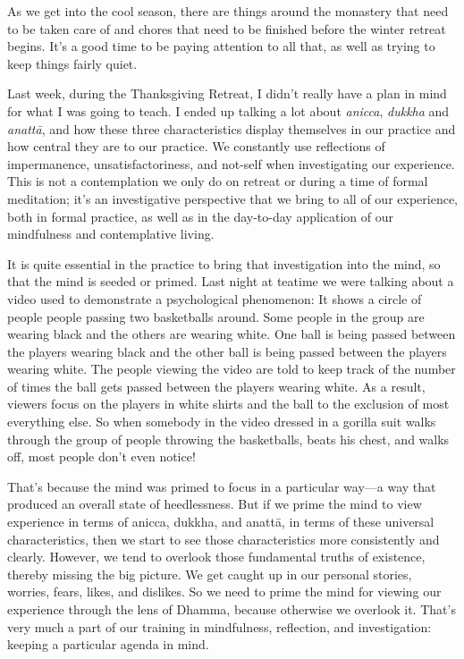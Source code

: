 
As we get into the cool season, there are things around the monastery 
that need to be taken care of and chores that need to be finished 
before the winter retreat begins. It's a good time to be paying 
attention to all that, as well as trying to keep things fairly quiet.

Last week, during the Thanksgiving Retreat, I didn't really have a plan 
in mind for what I was going to teach. I ended up talking a lot about 
\emph{anicca}, \emph{dukkha} and \emph{anattā}, and how these three 
characteristics display themselves in our practice and how central they 
are to our practice. We constantly use reflections of impermanence, 
unsatisfactoriness, and not-self when investigating our experience. 
This is not a contemplation we only do on retreat or during a time of 
formal meditation; it's an investigative perspective that we bring to 
all of our experience, both in formal practice, as well as in the 
day-to-day application of our mindfulness and contemplative living.

It is quite essential in the practice to bring that investigation into 
the mind, so that the mind is seeded or primed. Last night at teatime 
we were talking about a video used to demonstrate a psychological 
phenomenon: It shows a circle of people people passing two basketballs 
around. Some people in the group are wearing black and the others are 
wearing white. One ball is being passed between the players wearing 
black and the other ball is being passed between the players wearing 
white. The people viewing the video are told to keep track of the 
number of times the ball gets passed between the players wearing white. 
As a result, viewers focus on the players in white shirts and the ball 
to the exclusion of most everything else. So when somebody in the video 
dressed in a gorilla suit walks through the group of people throwing 
the basketballs, beats his chest, and walks off, most people don't even 
notice!

That's because the mind was primed to focus in a particular way---a way 
that produced an overall state of heedlessness. But if we prime the 
mind to view experience in terms of anicca, dukkha, and anattā, in 
terms of these universal characteristics, then we start to see those 
characteristics more consistently and clearly. However, we tend to 
overlook those fundamental truths of existence, thereby missing the big 
picture. We get caught up in our personal stories, worries, fears, 
likes, and dislikes. So we need to prime the mind for viewing our 
experience through the lens of Dhamma, because otherwise we overlook 
it. That's very much a part of our training in mindfulness, reflection, 
and investigation: keeping a particular agenda in mind.


